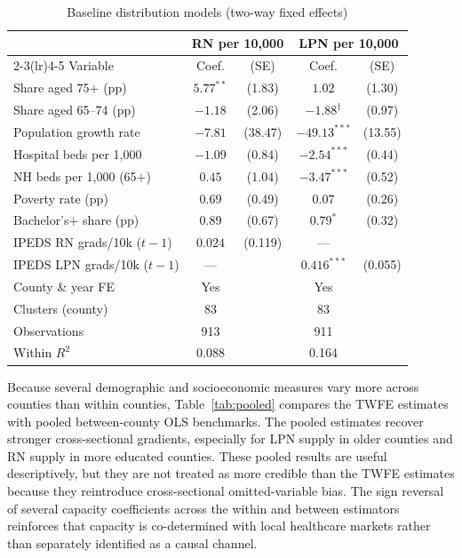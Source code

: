 \documentclass[12pt]{article}
\begin{document}
\begin{table}[!htbp]
\centering
\caption{Baseline distribution models (two-way fixed effects)}
\label{tab:baseline}
\small
\begin{tabular}{lcccc}
\toprule
 & \multicolumn{2}{c}{RN per 10{,}000} & \multicolumn{2}{c}{LPN per 10{,}000} \\
\cmidrule(lr){2-3}\cmidrule(lr){4-5}
Variable & Coef. & (SE) & Coef. & (SE) \\
\midrule
Share aged 75$+$ (pp) & $5.77^{**}$ & (1.83) & $1.02$ & (1.30) \\
Share aged 65--74 (pp) & $-1.18$ & (2.06) & $-1.88^{\dagger}$ & (0.97) \\
Population growth rate & $-7.81$ & (38.47) & $-49.13^{***}$ & (13.55) \\
Hospital beds per 1{,}000 & $-1.09$ & (0.84) & $-2.54^{***}$ & (0.44) \\
NH beds per 1{,}000 (65$+$) & $0.45$ & (1.04) & $-3.47^{***}$ & (0.52) \\
Poverty rate (pp) & $0.69$ & (0.49) & $0.07$ & (0.26) \\
Bachelor's$+$ share (pp) & $0.89$ & (0.67) & $0.79^{*}$ & (0.32) \\
IPEDS RN grads/10k ($t-1$) & $0.024$ & (0.119) & --- &  \\
IPEDS LPN grads/10k ($t-1$) & --- &  & $0.416^{***}$ & (0.055) \\
\midrule
County \& year FE & Yes & & Yes & \\
Clusters (county) & 83 & & 83 & \\
Observations & 913 & & 911 & \\
Within $R^{2}$ & 0.088 & & 0.164 & \\
\bottomrule
\end{tabular}
\end{table}

Because several demographic and socioeconomic measures vary more across
counties than within counties, Table~\ref{tab:pooled} compares the TWFE
estimates with pooled between-county OLS benchmarks. The pooled estimates
recover stronger cross-sectional gradients, especially for LPN supply in
older counties and RN supply in more educated counties. These pooled results
are useful descriptively, but they are not treated as more credible than the
TWFE estimates because they reintroduce cross-sectional omitted-variable
bias. The sign reversal of several capacity coefficients across the within
and between estimators reinforces that capacity is co-determined with local
healthcare markets rather than separately identified as a causal channel.
\end{document}
